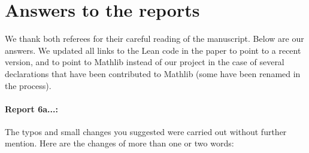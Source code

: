 \documentclass[11pt]{article}
\begin{document}
\section*{Answers to the reports}
We thank both referees for their careful reading of the manuscript. Below are our answers.
We updated all links to the Lean code in the paper to point to a recent version, and to point to Mathlib instead of our project in the case of several declarations that have been contributed to Mathlib (some have been renamed in the process).

\paragraph{Report 6a...:}
The typos and small changes you suggested were carried out without further mention. Here are the changes of more than one or two words:
\end{document}
